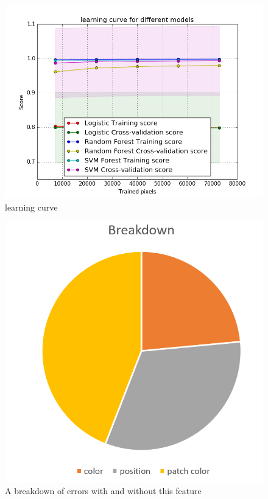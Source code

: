 \documentclass[conference]{IEEEtran}
\begin{document}
\begin{figure}[h!]
\centering 
\caption{learning curve}
\includegraphics[scale = 0.4]{myfig.png}
\end{figure}


\begin{figure}[h!]
\centering 
\caption{A breakdown of errors with and without this feature}
\includegraphics[scale = 0.4]{Snipaste_2018-05-28_13-52-29.png}
\end{figure}
\end{document}
